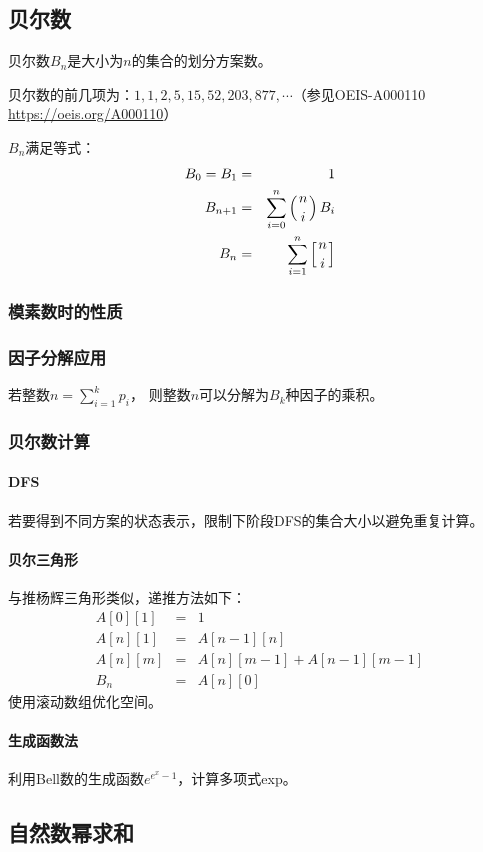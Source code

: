 \subsection{贝尔数}
贝尔数$B_n$是大小为$n$的集合的划分方案数。

贝尔数的前几项为：$1, 1, 2, 5, 15, 52, 203, 877,\cdots$（参见OEIS-A000110
\url{https://oeis.org/A000110}）

$B_n$满足等式：
\begin{eqnarray*}
	B_0=B_1&=&1\\
	B_{n+1}&=&\sum_{i=0}^n{\left(n \atop i\right)B_i}\\
	B_n&=&\sum_{i=1}^n{\left[n \atop i\right]}
\end{eqnarray*}

\subsubsection{模素数时的性质}

\subsubsection{因子分解应用}
若整数$\displaystyle n=\sum_{i=1}^k{p_i}$，
则整数$n$可以分解为$B_k$种因子的乘积。
\subsubsection{贝尔数计算}
\paragraph{DFS}若要得到不同方案的状态表示，限制下阶段DFS的集合大小以避免重复计算。
\paragraph{贝尔三角形}
与推杨辉三角形类似，递推方法如下：
\begin{eqnarray*}
	A[0][1]&=&1\\
	A[n][1]&=&A[n-1][n]\\
	A[n][m]&=&A[n][m-1]+A[n-1][m-1]\\
	B_n&=&A[n][0]
\end{eqnarray*}
使用滚动数组优化空间。
\paragraph{生成函数法}
利用Bell数的生成函数$e^{e^x-1}$，计算多项式exp。
\subsection{自然数幂求和}


